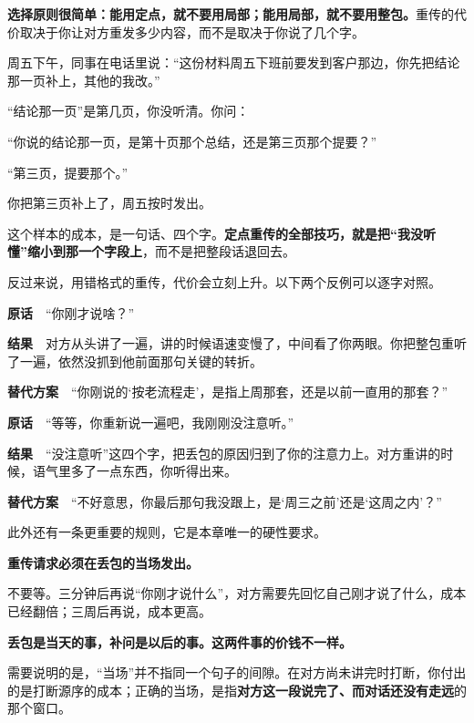 \textbf{选择原则很简单：能用定点，就不要用局部；能用局部，就不要用整包。}重传的代价取决于你让对方重发多少内容，而不是取决于你说了几个字。

\par
\begin{mdquote}
周五下午，同事在电话里说：“这份材料周五下班前要发到客户那边，你先把结论那一页补上，其他的我改。”

“结论那一页”是第几页，你没听清。你问：

“你说的结论那一页，是第十页那个总结，还是第三页那个提要？”

“第三页，提要那个。”

你把第三页补上了，周五按时发出。
\end{mdquote}

这个样本的成本，是一句话、四个字。\textbf{定点重传的全部技巧，就是把“我没听懂”缩小到那一个字段上}，而不是把整段话退回去。

反过来说，用错格式的重传，代价会立刻上升。以下两个反例可以逐字对照。

\begin{mdquote}
\textbf{原话}　“你刚才说啥？”

\textbf{结果}　对方从头讲了一遍，讲的时候语速变慢了，中间看了你两眼。你把整包重听了一遍，依然没抓到他前面那句关键的转折。

\textbf{替代方案}　“你刚说的‘按老流程走’，是指上周那套，还是以前一直用的那套？”
\end{mdquote}

\begin{mdquote}
\textbf{原话}　“等等，你重新说一遍吧，我刚刚没注意听。”

\textbf{结果}　“没注意听”这四个字，把丢包的原因归到了你的注意力上。对方重讲的时候，语气里多了一点东西，你听得出来。

\textbf{替代方案}　“不好意思，你最后那句我没跟上，是‘周三之前’还是‘这周之内’？”
\end{mdquote}

此外还有一条更重要的规则，它是本章唯一的硬性要求。

\begin{alertbox}[重要提示]
\textbf{重传请求必须在丢包的当场发出。}
\end{alertbox}

不要等。三分钟后再说“你刚才说什么”，对方需要先回忆自己刚才说了什么，成本已经翻倍；三周后再说，成本更高。

\textbf{丢包是当天的事，补问是以后的事。这两件事的价钱不一样。}

需要说明的是，“当场”并不指同一个句子的间隙。在对方尚未讲完时打断，你付出的是打断源序的成本；正确的当场，是指\textbf{对方这一段说完了、而对话还没有走远}的那个窗口。

